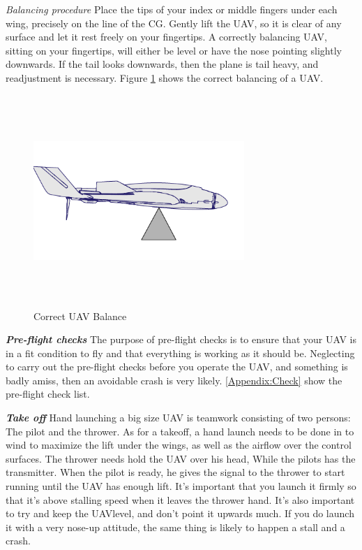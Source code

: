 \textit{Balancing procedure} Place the tips of your index or middle fingers under each wing, precisely on the line of the CG. Gently lift the UAV, so it is clear of any surface and let it rest freely on your fingertips.
A correctly balancing UAV, sitting on your fingertips, will either be level or have the nose pointing slightly downwards. If the tail looks downwards, then the plane is tail heavy, and readjustment is necessary. Figure \ref{fig:Balance} shows the correct balancing of a UAV.

\begin{figure}[H]
\centering
\includegraphics[width=8cm,height=8cm,keepaspectratio]{imagenes/Balance.png}
\caption{Correct UAV Balance}
\label{fig:Balance}
\end{figure}
\textit{\textbf{Pre-flight checks}} \newline
The purpose of pre-flight checks is to ensure that your UAV is in a fit condition to fly and that everything is working as it should be.  Neglecting to carry out the pre-flight checks before you operate the UAV, and something is badly amiss, then an avoidable crash is very likely.  \ref{Appendix:Check} show the pre-flight check list.

\textit{\textbf{Take off}} \newline
Hand launching a big size UAV is teamwork consisting of two persons: The pilot and the thrower. As for a takeoff, a hand launch needs to be done in to wind to maximize the lift under the wings, as well as the airflow over the control surfaces.
The thrower needs hold the UAV over his head, While the pilots has the transmitter. When the pilot is ready, he gives the signal to the thrower to start running until the UAV has enough lift. It's important that you launch it firmly so that it's above stalling speed when it leaves the thrower hand. 
It's also important to try and keep the UAVlevel, and don't point it upwards much. If you do launch it with a very nose-up attitude, the same thing is likely to happen a stall and a crash.

